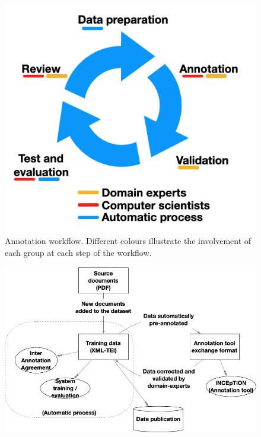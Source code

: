 \documentclass[fleqn,10pt]{wlscirep}
\begin{document}
\begin{figure}[htb]
\centering
  \centering
  \includegraphics[width=0.5\linewidth]{workflow-schema}
  \caption{Annotation workflow. Different colours illustrate the involvement of each group at each step of the workflow.}
  \label{fig:schema-comparison-modified-workflow}
\end{figure}

\begin{figure}[htb]
    \centering
    \includegraphics[width=\linewidth]{data-transformation.png}
    \label{fig:data-transformation}
\end{figure}
\end{document}
